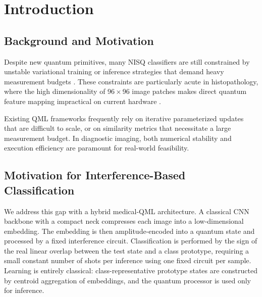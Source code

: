 \documentclass[conference]{IEEEtran}
\begin{document}
\section{Introduction}

\subsection{Background and Motivation}
Despite new quantum primitives, many NISQ classifiers are still constrained by unstable variational training \cite{benedetti2019parameterized,mcclean2018barren} or inference strategies that demand heavy measurement budgets \cite{schuld2019feature,havlicek2019supervised}. These constraints are particularly acute in histopathology, where the high dimensionality of 96\,$\times$\,96 image patches makes direct quantum feature mapping impractical on current hardware \cite{preskill2018nisq}.

Existing QML frameworks frequently rely on iterative parameterized updates that are difficult to scale, or on similarity metrics that necessitate a large measurement budget. In diagnostic imaging, both numerical stability and execution efficiency are paramount for real-world feasibility.

\subsection{Motivation for Interference-Based Classification}
We address this gap with a hybrid medical-QML architecture. A classical CNN backbone with a compact neck compresses each image into a low-dimensional embedding. The embedding is then amplitude-encoded into a quantum state and processed by a fixed interference circuit. Classification is performed by the sign of the real linear overlap between the test state and a class prototype, requiring a small constant number of shots per inference using one fixed circuit per sample. Learning is entirely classical: class-representative prototype states are constructed by centroid aggregation of embeddings, and the quantum processor is used only for inference.
\end{document}
